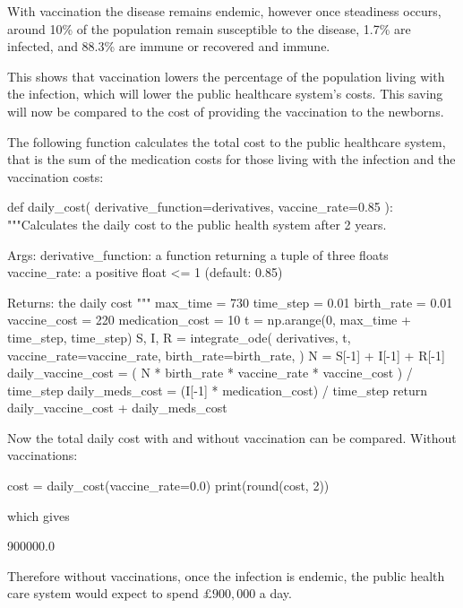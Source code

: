 With vaccination the disease remains endemic, however once steadiness occurs,
around 10\% of the population remain susceptible to the disease, 1.7\% are
infected, and 88.3\% are immune or recovered and immune.

This shows that vaccination lowers the percentage of the population living with
the infection, which will lower the public healthcare system's costs. This
saving will now be compared to the cost of providing the vaccination to the
newborns.

The following function calculates the total cost to the public healthcare
system, that is the sum of the medication costs for those living with the
infection and the vaccination costs:

\begin{pyin}
def daily_cost(
    derivative_function=derivatives, vaccine_rate=0.85
):
    """Calculates the daily cost to the public health system
    after 2 years.

    Args:
        derivative_function: a function returning a tuple
                             of three floats
        vaccine_rate: a positive float <= 1 (default: 0.85)

    Returns:
        the daily cost
    """
    max_time = 730
    time_step = 0.01
    birth_rate = 0.01
    vaccine_cost = 220
    medication_cost = 10
    t = np.arange(0, max_time + time_step, time_step)
    S, I, R = integrate_ode(
        derivatives,
        t,
        vaccine_rate=vaccine_rate,
        birth_rate=birth_rate,
    )
    N = S[-1] + I[-1] + R[-1]
    daily_vaccine_cost = (
        N * birth_rate * vaccine_rate * vaccine_cost
    ) / time_step
    daily_meds_cost = (I[-1] * medication_cost) / time_step
    return daily_vaccine_cost + daily_meds_cost
\end{pyin}

Now the total daily cost with and without vaccination can be compared. Without
vaccinations:

\begin{pyin}
cost = daily_cost(vaccine_rate=0.0)
print(round(cost, 2))
\end{pyin}

which gives

\begin{pyout}
900000.0
\end{pyout}

Therefore without vaccinations, once the infection is endemic, the public health
care system would expect to spend $\pounds 900,000$ a day.

